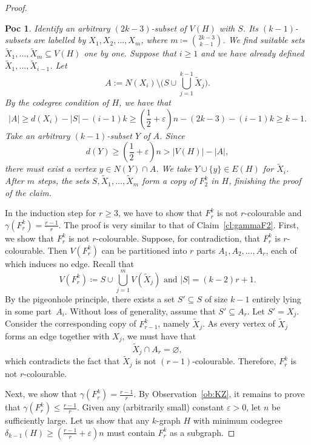 \documentclass[10pt,a4paper]{amsart}
\newtheorem{poc}{Poc}
\begin{document}
\begin{proof}
\begin{poc}
Identify  an arbitrary $(2k-3)$-subset of $V(H)$ with $S$. Its $(k-1)$-subsets are labelled by $X_1,X_2,\dots,X_m$, where $m\coloneqq \binom{2k-3}{k-1}$. We find suitable sets  $\tilde{X}_1,\dots,\tilde{X}_m\subseteq V(H)$ one by one. Suppose that $i\ge 1$ and we have already defined $\tilde{X}_1,\dots,\tilde{X}_{i-1}$. Let 
\[
A:=N(X_i)\setminus\Big(S\cup \bigcup_{j=1}^{k-1} \tilde{X}_j\Big).
\]By the codegree condition of $H$, we have that
    $$
    |A|\ge d(X_i)-|S|-(i-1)k\ge \left(\frac{1}{2}+\varepsilon\right)n-(2k-3)-(i-1)k\ge %
     k-1.
    $$
    Take an arbitrary $(k-1)$-subset $Y$ of $A$. Since 
    \[
    d(Y)\ge \left(\frac12+\varepsilon\right)n> |V(H)|-|A|,
    \] 
    there must exist a vertex $y\in N(Y)\cap A$. We take $Y\cup \{y\}\in E(H)$ for $\tilde{X}_i$.  After $m$ steps, the sets $S, \tilde{X}_{1},\dots,\tilde{X}_{m}$ form a copy of $F^k_2$ in $H$, finishing the proof of the claim.  
\end{poc}

In the induction step for $r\ge 3$, we have to show that  $F^k_{r}$ is not $r$-colourable and $\gamma(F^k_{r}) =\frac{r-1}{r}$. The proof is very similar to that of Claim~\ref{cl:gammaF2}. 
First, we show that $F^k_r$ is not $r$-colourable.  Suppose, for contradiction, that $F^k_r$ is $r$-colourable. Then $V(F^k_r)$ can be partitioned into $r$ parts $A_1,A_2,\dots,A_r$, each of which induces no edge. Recall that \[V(F^k_r) \coloneqq S\cup \bigcup^m_{j=1}V\left(\tilde{X}_j\right) \text{ and } |S| = (k-2)r+1.\]
By the pigeonhole principle, there exists a set $S' \subseteq S$ of size $k-1$ entirely lying in some part~$A_i$.  Without loss of generality, assume that $S'\subseteq A_r$. Let $S'=X_j$. Consider the corresponding copy of $F^k_{r-1}$, namely $\tilde{X}_j$.
As every vertex of $\tilde{X}_j$ forms an edge together with $X_j$, we must have that
\[
\tilde{X}_j \cap A_r = \varnothing,
\]
which contradicts the fact that $\tilde{X}_j$ is not $(r-1)$-colourable.
Therefore, $F^k_r$ is not $r$-colourable.


Next, we show that $\gamma(F^k_r)=\frac{r-1}{r}$. By Observation~\ref{ob:KZ}, it remains to prove that $\gamma(F^k_r)\le \frac{r-1}{r}$. 
Given any (arbitrarily small) constant $\varepsilon>0$, let $n$ be sufficiently large. Let us show that any $k$-graph $H$ with minimum codegree $\delta_{k-1}(H)\ge (\frac{r-1}{r}+\varepsilon)n$ must contain $F^k_r$ as a subgraph.


\end{proof}
\end{document}
